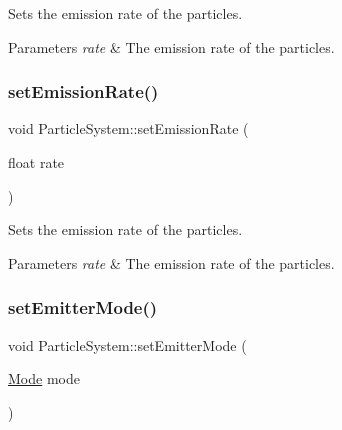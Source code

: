 Sets the emission rate of the particles.


\begin{DoxyParams}{Parameters}
{\em rate} & The emission rate of the particles. \\
\hline
\end{DoxyParams}
\mbox{\label{classParticleSystem_a9daefaa668017683b11e49f260f70049}} 
\subsubsection{\texorpdfstring{set\+Emission\+Rate()}{setEmissionRate()}\hspace{0.1cm}{\footnotesize\ttfamily [2/2]}}
{\footnotesize\ttfamily void Particle\+System\+::set\+Emission\+Rate (\begin{DoxyParamCaption}\item[{float}]{rate }\end{DoxyParamCaption})\hspace{0.3cm}{\ttfamily [inline]}}

Sets the emission rate of the particles.


\begin{DoxyParams}{Parameters}
{\em rate} & The emission rate of the particles. \\
\hline
\end{DoxyParams}
\mbox{\label{classParticleSystem_aeac528ed49a4782003bf21aeb5e321d4}} 
\subsubsection{\texorpdfstring{set\+Emitter\+Mode()}{setEmitterMode()}\hspace{0.1cm}{\footnotesize\ttfamily [1/2]}}
{\footnotesize\ttfamily void Particle\+System\+::set\+Emitter\+Mode (\begin{DoxyParamCaption}\item[{\hyperlink{classParticleSystem_aa380bd1c6062c44d56268a61ade9c8fb}{Mode}}]{mode }\end{DoxyParamCaption})\hspace{0.3cm}{\ttfamily [inline]}}

